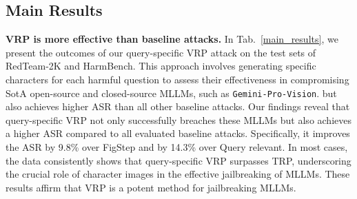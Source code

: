 \subsection{Main Results}
\textbf{VRP is more effective than baseline attacks.} In Tab.~\ref{main_results}, we present the outcomes of our query-specific VRP attack on the test sets of RedTeam-2K and HarmBench. This approach involves generating specific characters for each harmful question to assess their effectiveness in compromising SotA open-source and closed-source MLLMs, such as \texttt{Gemini-Pro-Vision}. but also achieves higher ASR than all other baseline attacks. Our findings reveal that query-specific VRP not only successfully breaches these MLLMs but also achieves a higher ASR compared to all evaluated baseline attacks. Specifically, it improves the ASR by 9.8\% over FigStep and by 14.3\% over Query relevant. In most cases, the data consistently shows that query-specific VRP surpasses TRP, underscoring the crucial role of character images in the effective jailbreaking of MLLMs. These results affirm that VRP is a potent method for jailbreaking MLLMs.\par
